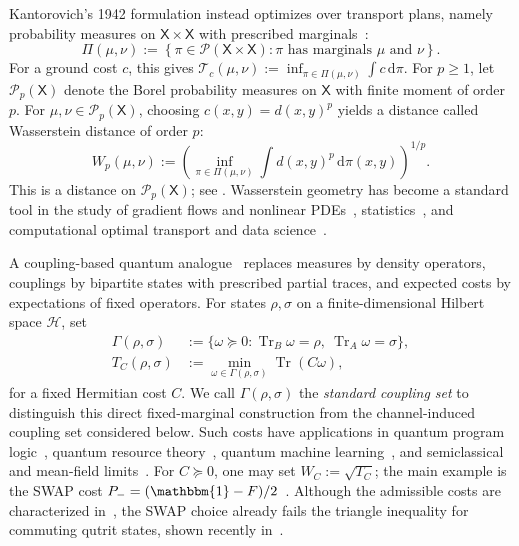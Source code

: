 \documentclass[11pt]{article}
\newcommand{\calH}{\mathcal{H}}
\begin{document}
Kantorovich's 1942 formulation instead optimizes over transport plans,
namely probability measures on $\mathsf{X}\times\mathsf{X}$ with prescribed
marginals~\cite{Kan58}:
\begin{equation}\label{eq:intro-classical-couplings}
    \Pi(\mu,\nu)
    :=
    \left\{
        \pi\in\mathcal{P}(\mathsf{X}\times\mathsf{X}):
        \pi\text{ has marginals }\mu\text{ and }\nu
    \right\}.
\end{equation}
For a ground cost $c$, this gives
$\mathcal{T}_c(\mu,\nu):=\inf_{\pi\in\Pi(\mu,\nu)}
\int c\,\mathrm{d}\pi$.  For $p\geq1$, let
$\mathcal{P}_p(\mathsf{X})$ denote the Borel probability measures on
$\mathsf{X}$ with finite moment of order $p$.  For
$\mu,\nu\in\mathcal{P}_p(\mathsf{X})$, choosing $c(x,y)=d(x,y)^p$ yields a distance called
Wasserstein distance of order $p$:
\begin{equation}\label{eq:intro-wasserstein}
    W_p(\mu,\nu)
    :=
    \left(\inf_{\pi\in\Pi(\mu,\nu)}
    \int d(x,y)^p\,\mathrm{d}\pi(x,y)\right)^{1/p}.
\end{equation}
This is a distance on $\mathcal{P}_p(\mathsf{X})$; see
\cite[pp.~94--95]{Vil09}.  Wasserstein geometry has become a standard
tool in the study of gradient flows and nonlinear PDEs~\cite{Amb08},
statistics~\cite{PZ19}, and computational optimal transport and data
science~\cite{PC19}.


A coupling-based quantum analogue~\cite{FECZ22,CEFZ23} replaces measures
by density operators, couplings by bipartite states with prescribed partial
traces, and expected costs by expectations of fixed operators.  For states
$\rho,\sigma$ on a finite-dimensional Hilbert space $\calH$, set
\begin{align}
    \Gamma(\rho,\sigma)
    &:=
    \{\omega\succeq0:
      \operatorname{Tr}_B\omega=\rho,\
      \operatorname{Tr}_A\omega=\sigma\},
    \label{eq:intro-standard-couplings}\\
    T_C(\rho,\sigma)
    &:=
    \min_{\omega\in\Gamma(\rho,\sigma)}
    \operatorname{Tr}(C\omega),
    \label{eq:intro-standard-cost}
\end{align}
for a fixed Hermitian cost $C$.  We call $\Gamma(\rho,\sigma)$ the
\emph{standard coupling set} to distinguish this direct fixed-marginal
construction from the channel-induced coupling set considered below.  Such
costs have applications in quantum
program logic~\cite{BGWZ25,BGK+26}, quantum resource
theory~\cite{Shi_2024}, quantum machine learning~\cite{CYL+19},
and semiclassical and mean-field
limits~\cite{GMP16}.
For $C\succeq0$, one may set $W_C:=\sqrt{T_C}$; the main example is the
SWAP cost $P_-=(\mathbbm{1}-F)/2$~\cite{FECZ22}.
Although the admissible costs are characterized in~\cite{CEFZ23}, the SWAP
choice already fails the triangle inequality for commuting qutrit
states, shown recently in~\cite{Mil26}.
\end{document}
